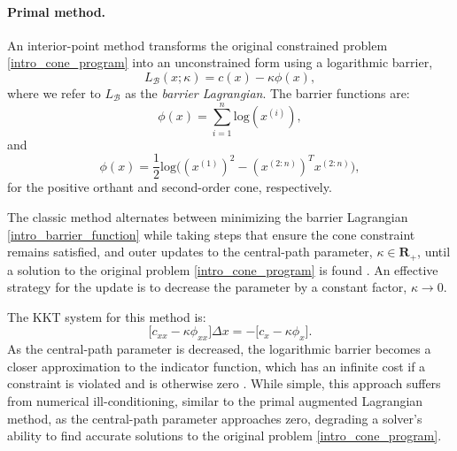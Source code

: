 \paragraph{Primal method.}
An interior-point method transforms the original constrained problem  \eqref{intro_cone_program} into an unconstrained form using a logarithmic barrier, 
\begin{equation}
	L_{\mathcal{B}}(x; \kappa) = c(x) - \kappa \phi(x),
	\label{intro_barrier_function}
\end{equation}
where we refer to $L_{\mathcal{B}}$ as the \textit{barrier Lagrangian}. The barrier functions are:
\begin{equation}
	\phi(x) = \sum \limits_{i = 1}^n \mbox{log}(x^{(i)}),
\end{equation}
and 
\begin{equation}
	\phi(x) = \frac{1}{2} \mbox{log}\Big((x^{(1)})^2 - (x^{(2:n)})^T x^{(2:n)} \Big),
\end{equation}
for the positive orthant and second-order cone, respectively.

The classic method alternates between minimizing the barrier Lagrangian \eqref{intro_barrier_function} while taking steps that ensure the cone constraint remains satisfied, and outer updates to the central-path parameter, $\kappa \in \mathbf{R}_{+}$, until a solution to the original problem \eqref{intro_cone_program} is found \cite{boyd2004convex}. An effective strategy for the update is to decrease the parameter by a constant factor, $\kappa \rightarrow 0$. 

The KKT system for this method is:
\begin{equation}
	\Big[c_{xx} - \kappa \phi_{xx} \Big] \Delta x = -\Big[c_x - \kappa \phi_x \Big]. \label{intro_barrier_gradient}
\end{equation}
As the central-path parameter is decreased, the logarithmic barrier becomes a closer approximation to the indicator function, which has an infinite cost if a constraint is violated and is otherwise zero \cite{boyd2004convex}. While simple, this approach suffers from numerical ill-conditioning, similar to the primal augmented Lagrangian method, as the central-path parameter approaches zero, degrading a solver's ability to find accurate solutions to the original problem \eqref{intro_cone_program}.

